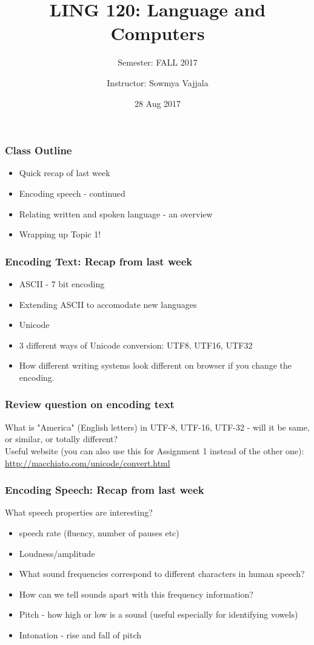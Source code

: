 \documentclass{beamer}
\author[Sowmya Vajjala]{Instructor: Sowmya Vajjala}
\title[LING 120]{LING 120: Language and Computers}
\subtitle{Semester: FALL 2017}
\date{28 Aug 2017}
\institute{Iowa State University, USA}
\begin{document}
\begin{frame}\titlepage
\end{frame}

\begin{frame}
\frametitle{Class Outline}
\begin{itemize}
\item Quick recap of last week %
\item Encoding speech  - continued
\item Relating written and spoken language - an overview
\item Wrapping up Topic 1! %
\end{itemize}
\end{frame}

\begin{frame}
\frametitle{Encoding Text: Recap from last week}
\begin{itemize}
\item ASCII - 7 bit encoding
\item Extending ASCII to accomodate new languages
\item Unicode
\item 3 different ways of Unicode conversion: UTF8, UTF16, UTF32
\item How different writing systems look different on browser if you change the encoding. 
\end{itemize}
\end{frame}

\begin{frame}
\frametitle{Review question on encoding text}
What is "America" (English letters) in UTF-8, UTF-16, UTF-32 - will it be same, or similar, or totally different? \pause
\medskip \\ Useful website (you can also use this for Assignment 1 instead of the other one): \url{http://macchiato.com/unicode/convert.html}
\end{frame}

\begin{frame}
\frametitle{Encoding Speech: Recap from last week}
What speech properties are interesting?
\begin{itemize}
\item speech rate (fluency, number of pauses etc)
\item Loudness/amplitude 
\item What sound frequencies correspond to different characters in human speech? 
\item How can we tell sounds apart with this frequency information?
\item Pitch - how high or low is a sound (useful especially for identifying vowels)
\item Intonation - rise and fall of pitch
\end{itemize}
\end{frame}
\end{document}

